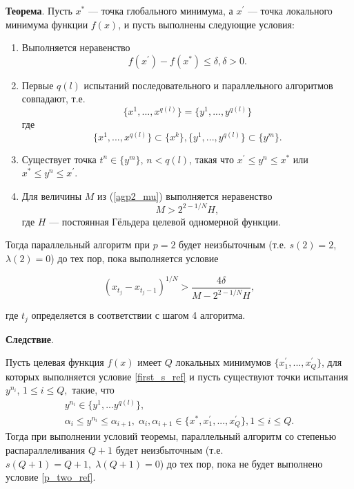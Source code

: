\documentclass[10pt,a4paper]{book}
\begin{document}
\textbf{Теорема}. Пусть $x^*$ — точка глобального минимума, а $x^{\prime}$ — точка локального минимума функции $f(x)$, и пусть выполнены следующие условия:
    \begin{enumerate}
        \item Выполняется неравенство
            \begin{equation} \label{first_s_ref}
                f(x^{\prime}) - f(x^*) \leq \delta, \delta > 0.
            \end{equation}
        \item Первые $q(l)$ испытаний последовательного и параллельного алгоритмов совпадают, т.е.
            \begin{equation} \label{second_s_ref}
                \{x^1,...,x^{q(l)}\} = \{y^1,...,y^{q(l)}\}
            \end{equation}
        где
            \begin{equation} \label{third_s_ref}
                \{x^1,...,x^{q(l)}\} \subset \{x^k\}, \{y^1,...,y^{q(l)}\}\subset \{y^m\}.
            \end{equation}
        \item Существует точка $t^n \in \{y^m\}$, $n < q(l)$, такая что $x^{\prime} \leq y^n \leq x^*$ или $x^* \leq y^n \leq x^{\prime}$.
        \item Для величины $M$ из (\ref{agp2_mu}) выполняется неравенство 
            \begin{equation} \label{fourth_s_ref}
                M > 2^{2 - 1/N} H,
            \end{equation}
        где $H$ — постоянная Гёльдера целевой одномерной функции.
    \end{enumerate}

Тогда параллельный алгоритм при $p=2$ будет неизбыточным (т.е. $s(2)=2$, $\lambda(2)=0$) до тех пор, пока выполняется условие

\begin{equation} \label{p_two_ref}
    (x_{t_j} - x_{t_j - 1})^{1/N} > \frac{4\delta}{M - 2^{2 - 1/N} H},
\end{equation}

где $t_j$ определяется в соответствии с шагом 4 алгоритма.

\textbf{Следствие}.

Пусть целевая функция $f(x)$ имеет $Q$  локальных минимумов $\{x_1^{\prime},...,x_Q^{\prime}\}$, для которых выполняется условие \eqref{first_s_ref} и пусть существуют точки испытания $y^{n_i}$, $1 \leq i \leq Q,$ такие, что 
\begin{gather} 
    y^{n_i} \in \{y^1,...y^{q(l)}\}, \nonumber \\ 
    \alpha_i \leq y^{n_i} \leq \alpha_{i+1}, \; \alpha_i, \alpha_{i+1} \in \{x^*, x_1^{\prime},...,x_Q^{\prime}\}, 1 \leq i \leq Q. \nonumber
\end{gather}
Тогда при выполнении условий теоремы, параллельный алгоритм со степенью распараллеливания $Q+1$ будет неизбыточным (т.е. $s(Q+1)=Q+1, \; \lambda(Q+1) =0$) до тех пор, пока не будет выполнено условие \eqref{p_two_ref}.
\end{document}
